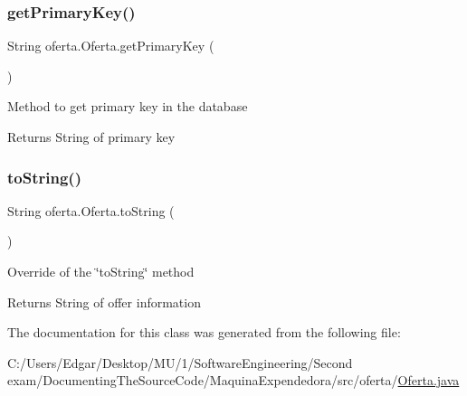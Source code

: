 \subsubsection{\texorpdfstring{get\+Primary\+Key()}{getPrimaryKey()}}
{\footnotesize\ttfamily String oferta.\+Oferta.\+get\+Primary\+Key (\begin{DoxyParamCaption}{ }\end{DoxyParamCaption})\hspace{0.3cm}{\ttfamily [inline]}}

Method to get primary key in the database

\begin{DoxyReturn}{Returns}
String of primary key 
\end{DoxyReturn}
\mbox{\label{classoferta_1_1_oferta_af4be574b1f0db93797a0a2fea7db2b07}} 
\subsubsection{\texorpdfstring{to\+String()}{toString()}}
{\footnotesize\ttfamily String oferta.\+Oferta.\+to\+String (\begin{DoxyParamCaption}{ }\end{DoxyParamCaption})\hspace{0.3cm}{\ttfamily [inline]}}

Override of the \char`\"{}to\+String\char`\"{} method \begin{DoxyReturn}{Returns}
String of offer information 
\end{DoxyReturn}


The documentation for this class was generated from the following file\+:\begin{DoxyCompactItemize}
\item 
C\+:/\+Users/\+Edgar/\+Desktop/\+M\+U/1/\+Software\+Engineering/\+Second exam/\+Documenting\+The\+Source\+Code/\+Maquina\+Expendedora/src/oferta/\mbox{\hyperlink{_oferta_8java}{Oferta.\+java}}\end{DoxyCompactItemize}
